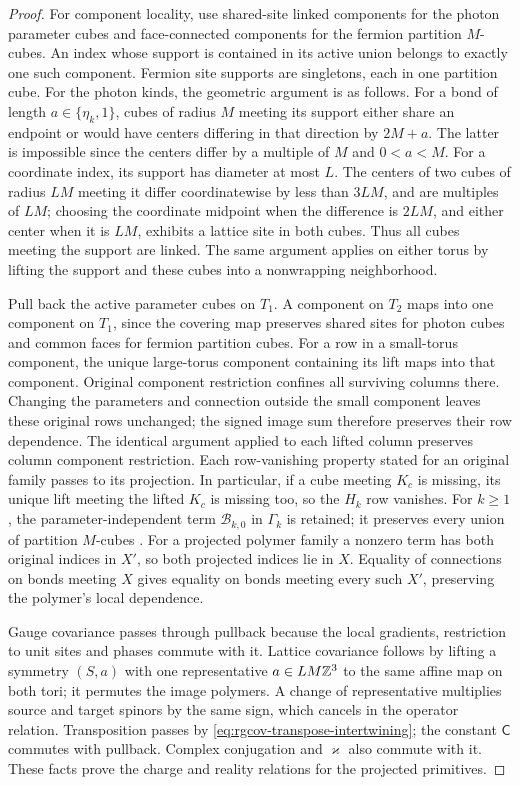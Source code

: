\begin{proof}
For component locality, use shared-site linked components for
the photon parameter cubes and face-connected components for
the fermion partition $M$-cubes. An index whose support is
contained in its active union belongs to exactly one such
component. Fermion site supports are singletons, each in one
partition cube. For the photon kinds, the geometric argument
is as follows. For a bond of
length $a\in\{\eta_k,1\}$, cubes of radius $M$ meeting
its support either share an endpoint or would have
centers differing in that direction by $2M+a$.
The latter is impossible since the centers differ by
a multiple of $M$ and $0<a<M$.
For a coordinate index, its support has diameter at
most $L$. The centers of two cubes of radius $LM$
meeting it differ coordinatewise by less than $3LM$,
and are multiples of $LM$; choosing the coordinate
midpoint when the difference is $2LM$, and either
center when it is $LM$, exhibits a lattice site in
both cubes. Thus all cubes meeting the support are
linked. The same argument applies on either torus
by lifting the support and these cubes into a
nonwrapping neighborhood.

Pull back the active parameter cubes on $T_1$.
A component on $T_2$ maps into one component on $T_1$,
since the covering map preserves shared sites for photon
cubes and common faces for fermion partition cubes.
For a row in a small-torus component, the unique
large-torus component containing its lift maps into
that component. Original component restriction
confines all surviving columns there.
Changing the parameters and connection outside the
small component leaves these original rows unchanged;
the signed image sum therefore preserves their row
dependence. The identical argument applied to each
lifted column preserves column component restriction.
Each row-vanishing property stated for an original family passes
to its projection. In particular, if a cube meeting $K_c$ is
missing, its unique lift meeting the lifted $K_c$ is missing
too, so the $H_k$ row vanishes. For $k\ge1$, the
parameter-independent term $\mathcal B_{k,0}$ in $\Gamma_k$
is retained; it preserves every union of partition $M$-cubes
\cite[Proposition~4.3 and its proof]{FermionBlockManuscript}.
For a projected polymer family a nonzero term has
both original indices in $X'$, so both projected
indices lie in $X$. Equality of connections on bonds
meeting $X$ gives equality on bonds meeting every
such $X'$, preserving the polymer's local dependence.

Gauge covariance passes through pullback because
the local gradients, restriction to unit sites and
phases commute with it. Lattice covariance follows
by lifting a symmetry $(S,a)$ with one representative
$a\in LM\mathbb Z^3$ to the same affine map on both tori;
it permutes the image polymers. A change of representative
multiplies source and target spinors by the same sign,
which cancels in the operator relation.
Transposition passes by
\eqref{eq:rgcov-transpose-intertwining};
the constant $\mathsf C$ commutes with pullback.
Complex conjugation and $\varkappa$ also commute
with it. These facts prove the charge and reality
relations for the projected primitives.


\end{proof}
